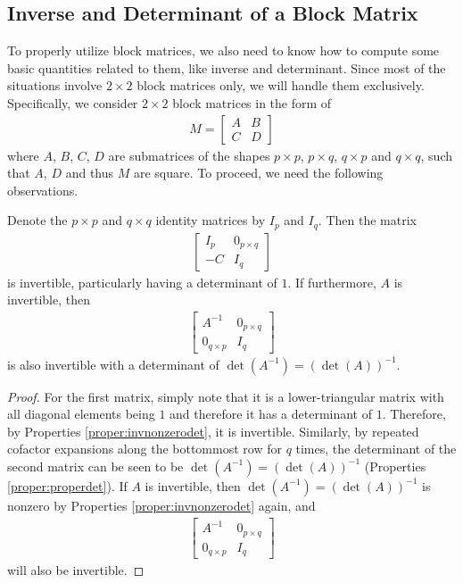 \subsection{Inverse and Determinant of a Block Matrix}
To properly utilize block matrices, we also need to know how to compute some basic quantities related to them, like inverse and determinant. Since most of the situations involve $2 \times 2$ block matrices only, we will handle them exclusively. Specifically, we consider $2 \times 2$ block matrices in the form of
\begin{align*}
M = \begin{bmatrix}
A & B \\
C & D
\end{bmatrix}
\end{align*}
where $A$, $B$, $C$, $D$ are submatrices of the shapes $p \times p$, $p \times q$, $q \times p$ and $q \times q$, such that $A$, $D$ and thus $M$ are square. To proceed, we need the following observations.
\begin{proper}
\label{proper:blockmatinv}
Denote the $p \times p$ and $q \times q$ identity matrices by $I_p$ and $I_q$. Then the matrix
\begin{align*}
\begin{bmatrix}
I_p & 0_{p \times q} \\
-C & I_q
\end{bmatrix}
\end{align*}
is invertible, particularly having a determinant of $1$. If furthermore, $A$ is invertible, then
\begin{align*}
\begin{bmatrix}
A^{-1} & 0_{p\times q} \\
0_{q\times p} & I_q
\end{bmatrix}
\end{align*}
is also invertible with a determinant of $\det(A^{-1}) = (\det(A))^{-1}$.
\end{proper}
\begin{proof}
For the first matrix, simply note that it is a lower-triangular matrix with all diagonal elements being $1$ and therefore it has a determinant of $1$. Therefore, by Properties \ref{proper:invnonzerodet}, it is invertible. Similarly, by repeated cofactor expansions along the bottommost row for $q$ times, the determinant of the second matrix can be seen to be $\det(A^{-1}) = (\det(A))^{-1}$ (Properties \ref{proper:properdet}). If $A$ is invertible, then $\det(A^{-1}) = (\det(A))^{-1}$ is nonzero by Properties \ref{proper:invnonzerodet} again, and 
\begin{align*}
\begin{bmatrix}
A^{-1} & 0_{p\times q} \\
0_{q\times p} & I_q
\end{bmatrix}    
\end{align*}
will also be invertible.
\end{proof}
